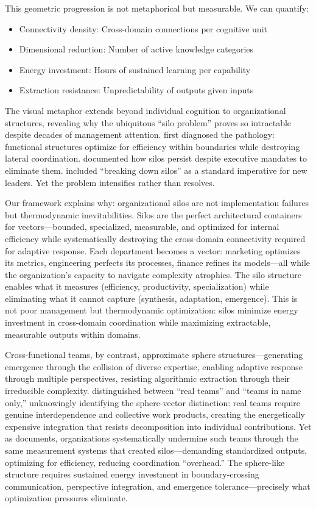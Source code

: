 This geometric progression is not metaphorical but measurable. We can quantify:
\begin{itemize}
\item Connectivity density: Cross-domain connections per cognitive unit
\item Dimensional reduction: Number of active knowledge categories
\item Energy investment: Hours of sustained learning per capability
\item Extraction resistance: Unpredictability of outputs given inputs
\end{itemize}

The visual metaphor extends beyond individual cognition to organizational structures, revealing why the ubiquitous ``silo problem'' proves so intractable despite decades of management attention. \citet{galbraith1973} first diagnosed the pathology: functional structures optimize for efficiency within boundaries while destroying lateral coordination. \citet{aaker2008} documented how silos persist despite executive mandates to eliminate them. \citet{watkins2013} included ``breaking down silos'' as a standard imperative for new leaders. Yet the problem intensifies rather than resolves.

Our framework explains why: organizational silos are not implementation failures but thermodynamic inevitabilities. Silos are the perfect architectural containers for vectors---bounded, specialized, measurable, and optimized for internal efficiency while systematically destroying the cross-domain connectivity required for adaptive response. Each department becomes a vector: marketing optimizes its metrics, engineering perfects its processes, finance refines its models---all while the organization's capacity to navigate complexity atrophies. The silo structure enables what it measures (efficiency, productivity, specialization) while eliminating what it cannot capture (synthesis, adaptation, emergence). This is not poor management but thermodynamic optimization: silos minimize energy investment in cross-domain coordination while maximizing extractable, measurable outputs within domains.

Cross-functional teams, by contrast, approximate sphere structures---generating emergence through the collision of diverse expertise, enabling adaptive response through multiple perspectives, resisting algorithmic extraction through their irreducible complexity. \citet{hackman2002} distinguished between ``real teams'' and ``teams in name only,'' unknowingly identifying the sphere-vector distinction: real teams require genuine interdependence and collective work products, creating the energetically expensive integration that resists decomposition into individual contributions. Yet as \citet{edmondson2012} documents, organizations systematically undermine such teams through the same measurement systems that created silos---demanding standardized outputs, optimizing for efficiency, reducing coordination ``overhead.'' The sphere-like structure requires sustained energy investment in boundary-crossing communication, perspective integration, and emergence tolerance---precisely what optimization pressures eliminate.

